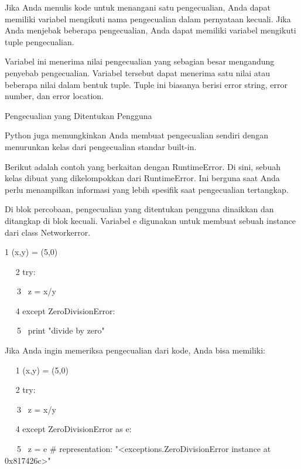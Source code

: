 \vspace{12pt}
Jika Anda menulis kode untuk menangani satu pengecualian, Anda dapat memiliki variabel mengikuti nama pengecualian dalam pernyataan kecuali. Jika Anda menjebak beberapa pengecualian, Anda dapat memiliki variabel mengikuti tuple pengecualian. \par
\vspace{12pt}
Variabel ini menerima nilai pengecualian yang sebagian besar mengandung penyebab pengecualian. Variabel tersebut dapat menerima satu nilai atau beberapa nilai dalam bentuk tuple. Tuple ini biasanya berisi error string, error number, dan error location. \par
\vspace{12pt}
Pengecualian yang Ditentukan Pengguna \par
\vspace{12pt}
Python juga memungkinkan Anda membuat pengecualian sendiri dengan menurunkan kelas dari pengecualian standar built-in. \par
\vspace{12pt}
Berikut adalah contoh yang berkaitan dengan RuntimeError. Di sini, sebuah kelas dibuat yang dikelompokkan dari RuntimeError. Ini berguna saat Anda perlu menampilkan informasi yang lebih spesifik saat pengecualian tertangkap. \par
\vspace{12pt}
Di blok percobaan, pengecualian yang ditentukan pengguna dinaikkan dan ditangkap di blok kecuali. Variabel e digunakan untuk membuat sebuah instance dari class Networkerror. \par
\vspace{12pt}
1 (x,y) = (5,0) \par
~~ 2 try: \par
~~~3~  z = x/y \par
~~ 4 except ZeroDivisionError: \par
~~~5~  print "divide by zero" \par
Jika Anda ingin memeriksa pengecualian dari kode, Anda bisa memiliki: \par
\vspace{12pt}
\vspace{12pt}
\vspace{12pt}
~~ 1 (x,y) = (5,0) \par
~~ 2 try: \par
~~~3~  z = x/y \par
~~ 4 except ZeroDivisionError as e: \par
~~~5~  z = e  $  \#  $ representation: "<exceptions.ZeroDivisionError instance at 0x817426c>" \par
